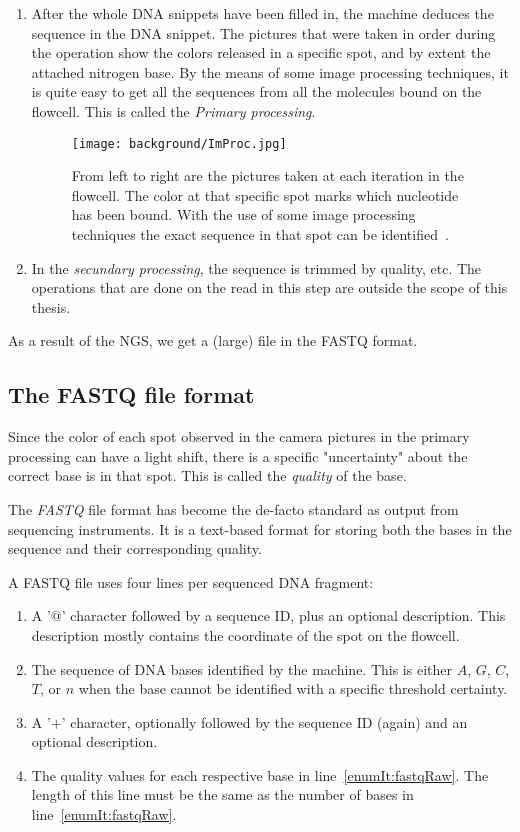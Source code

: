 \begin{enumerate}
	\item After the whole DNA snippets have been filled in, the machine deduces the sequence in the DNA snippet. The pictures that were taken in order during the operation show the colors released in a specific spot, and by extent the attached nitrogen base. By the means of some image processing techniques, it is quite easy to get all the sequences from all the molecules bound on the flowcell. This is called the \emph{Primary processing}.
	
	\begin{figure}[H]
		\centering
		\texttt{[image: background/ImProc.jpg]}
		\caption{From left to right are the pictures taken at each iteration in the flowcell. The color at that specific spot marks which nucleotide has been bound. With the use of some image processing techniques the exact sequence in that spot can be identified~\cite{pptHowest}.}
		\label{fig:ImProc}
	\end{figure}
	
	\item In the \emph{secundary processing}, the sequence is trimmed by quality, etc. The operations that are done on the read in this step are outside the scope of this thesis.
\end{enumerate}

As a result of the NGS, we get a (large) file in the FASTQ format.

\subsection{The FASTQ file format}
\label{expl:FASTQ}

Since the color of each spot observed in the camera pictures in the primary processing can have a light shift, there is a specific "uncertainty" about the correct base is in that spot. This is called the \emph{quality} of the base.

The \emph{FASTQ} file format has become the de-facto standard as output from sequencing instruments. It is a text-based format for storing both the bases in the sequence and their corresponding quality.

A FASTQ file uses four lines per sequenced DNA fragment:

\begin{enumerate}
	\item A '$@$' character followed by a sequence ID, plus an optional description. This description mostly contains the coordinate of the spot on the flowcell.
	\item \label{enumIt:fastqRaw} The sequence of DNA bases identified by the machine. This is either $A$, $G$, $C$, $T$, or $n$ when the base cannot be identified with a specific threshold certainty.
	\item A '$+$' character, optionally followed by the sequence ID (again) and an optional description.
	\item The quality values for each respective base in line~\ref{enumIt:fastqRaw}. The length of this line must be the same as the number of bases in line~\ref{enumIt:fastqRaw}.
\end{enumerate}


